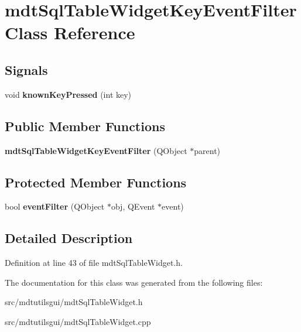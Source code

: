 \hypertarget{classmdt_sql_table_widget_key_event_filter}{
\section{mdtSqlTableWidgetKeyEventFilter Class Reference}
\label{classmdt_sql_table_widget_key_event_filter}
}
\subsection*{Signals}
\begin{DoxyCompactItemize}
\item 
\hypertarget{classmdt_sql_table_widget_key_event_filter_a9e91b7d427a1b6444da85a75b14e650d}{
void {\bfseries knownKeyPressed} (int key)}
\label{classmdt_sql_table_widget_key_event_filter_a9e91b7d427a1b6444da85a75b14e650d}

\end{DoxyCompactItemize}
\subsection*{Public Member Functions}
\begin{DoxyCompactItemize}
\item 
\hypertarget{classmdt_sql_table_widget_key_event_filter_ad44cd5588a14efcb3954f3b4950fc688}{
{\bfseries mdtSqlTableWidgetKeyEventFilter} (QObject $\ast$parent)}
\label{classmdt_sql_table_widget_key_event_filter_ad44cd5588a14efcb3954f3b4950fc688}

\end{DoxyCompactItemize}
\subsection*{Protected Member Functions}
\begin{DoxyCompactItemize}
\item 
\hypertarget{classmdt_sql_table_widget_key_event_filter_aad9dc6b018f347cb2b5eca672fdbbf27}{
bool {\bfseries eventFilter} (QObject $\ast$obj, QEvent $\ast$event)}
\label{classmdt_sql_table_widget_key_event_filter_aad9dc6b018f347cb2b5eca672fdbbf27}

\end{DoxyCompactItemize}


\subsection{Detailed Description}


Definition at line 43 of file mdtSqlTableWidget.h.



The documentation for this class was generated from the following files:\begin{DoxyCompactItemize}
\item 
src/mdtutilsgui/mdtSqlTableWidget.h\item 
src/mdtutilsgui/mdtSqlTableWidget.cpp\end{DoxyCompactItemize}
